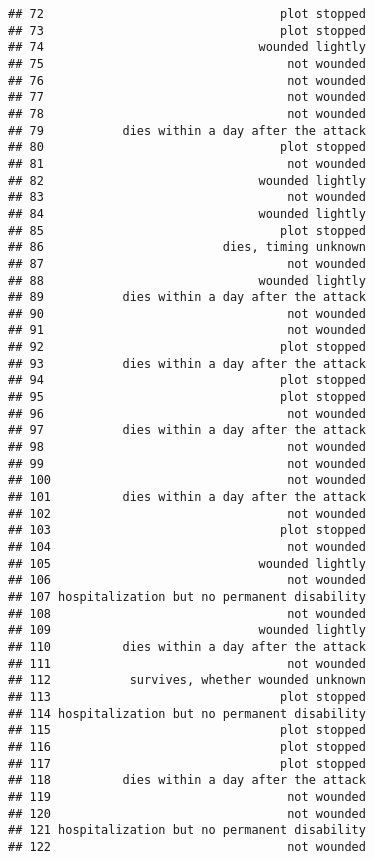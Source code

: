 \documentclass[
]{article}
\begin{document}
\begin{verbatim}
## 72                                 plot stopped
## 73                                 plot stopped
## 74                              wounded lightly
## 75                                  not wounded
## 76                                  not wounded
## 77                                  not wounded
## 78                                  not wounded
## 79           dies within a day after the attack
## 80                                 plot stopped
## 81                                  not wounded
## 82                              wounded lightly
## 83                                  not wounded
## 84                              wounded lightly
## 85                                 plot stopped
## 86                         dies, timing unknown
## 87                                  not wounded
## 88                              wounded lightly
## 89           dies within a day after the attack
## 90                                  not wounded
## 91                                  not wounded
## 92                                 plot stopped
## 93           dies within a day after the attack
## 94                                 plot stopped
## 95                                 plot stopped
## 96                                  not wounded
## 97           dies within a day after the attack
## 98                                  not wounded
## 99                                  not wounded
## 100                                 not wounded
## 101          dies within a day after the attack
## 102                                 not wounded
## 103                                plot stopped
## 104                                 not wounded
## 105                             wounded lightly
## 106                                 not wounded
## 107 hospitalization but no permanent disability
## 108                                 not wounded
## 109                             wounded lightly
## 110          dies within a day after the attack
## 111                                 not wounded
## 112           survives, whether wounded unknown
## 113                                plot stopped
## 114 hospitalization but no permanent disability
## 115                                plot stopped
## 116                                plot stopped
## 117                                plot stopped
## 118          dies within a day after the attack
## 119                                 not wounded
## 120                                 not wounded
## 121 hospitalization but no permanent disability
## 122                                 not wounded

\end{verbatim}
\end{document}
